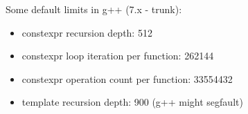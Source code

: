 Some default limits in g++ (7.x - trunk):
\begin{itemize}
\item constexpr recursion depth: 512
\item constexpr loop iteration per function: 262144
\item constexpr operation count per function: 33554432
\item template recursion depth: 900 (g++ might segfault)
\end{itemize}
